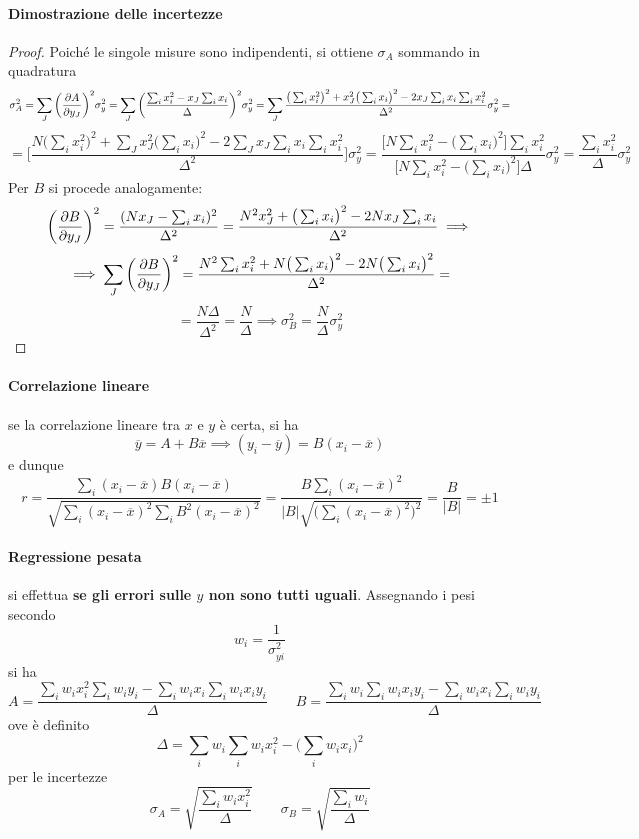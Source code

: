 \documentclass[10pt, oneside]{book}
\begin{document}
\paragraph{Dimostrazione delle incertezze}
\begin{proof}
Poiché le singole misure sono indipendenti, si ottiene $\sigma_A$ sommando in quadratura
\[\sigma_A^2 = \sum_J \bigg(\pdv{A}{y_J}\bigg)^2 \sigma_y^2 = \sum_J \bigg(\frac{\sum_i x_i^2 - x_J \sum_i x_i}{\Delta}\bigg)^{2} \sigma_y^2 = \sum_J \frac{\big(\sum_i x_i^2\big)^2 + x_J^2 \big(\sum_i x_i\big)^2 - 2 x_J \sum_i x_i \sum_i x_i^2}{\Delta^2} \sigma_y^2 = \]
\[= \bigg[\frac{N \big(\sum_i x_i^2\big)^2 + \sum_J x_J^2 \big(\sum_i x_i\big)^2 - 2 \sum_J x_J \sum_i x_i \sum_i x_i^2}{\Delta^2}\bigg] \sigma_y^2 = \frac{\big[N \sum_i x_i^2 - \big(\sum_i x_i\big)^2\big] \sum_i x_i^2}{\big[N \sum_i x_i^2 - \big(\sum_i x_i\big)^2\big] \Delta} \sigma_y^2 = \frac{\sum_i x_i^2}{\Delta} \sigma_y^2\]
Per $B$ si procede analogamente:
\[\bigg(\pdv{B}{y_J}\bigg)^2 = \frac{(N x_J - \sum_i x_i)^2}{\Delta^2} = \frac{N^2 x_J^2 + \big(\sum_i x_i\big)^2 - 2 N x_J \sum_i x_i}{\Delta^2} \implies \]
\[\implies \sum_J \bigg(\pdv{B}{y_J}\bigg)^2 = \frac{N^2 \sum_i x_i^2 + N \big(\sum_i x_i\big)^2 - 2 N \big(\sum_i x_i\big)^2}{\Delta^2} =\]
\[= \frac{N \Delta}{\Delta^2} = \frac{N}{\Delta} \implies \sigma_B^2 = \frac{N}{\Delta} \sigma_y^2\]
\end{proof}

\paragraph{Correlazione lineare} se la correlazione lineare tra $x$ e $y$ è certa, si ha
\[\overline{y} = A + B \overline{x} \implies (y_i - \overline{y}) = B (x_i - \overline{x})\]
e dunque
\[r = \frac{\sum_i (x_i - \overline{x}) B (x_i - \overline{x})}{\sqrt{\sum_i (x_i - \overline{x})^2 \sum_i B^2 (x_i - \overline{x})^2}} = \frac{B \sum_i (x_i - \overline{x})^2}{|B| \sqrt{\big(\sum_i (x_i - \overline{x})^2\big)^2}} = \frac{B}{|B|} = \pm 1\]
\paragraph{Regressione pesata} si effettua \textbf{se gli errori sulle $y$ non sono tutti uguali}. Assegnando i pesi secondo
\[w_i = \frac{1}{\sigma_{yi}^2}\]
si ha
\[A = \frac{\sum_i w_i x_i^2 \sum_i w_i y_i - \sum_i w_i x_i \sum_i w_i x_i y_i}{\Delta} \qquad B = \frac{\sum_i w_i \sum_i w_i x_i y_i - \sum_i w_i x_i \sum_i w_i y_i}{\Delta}\]
ove è definito
\[\Delta = \sum_i w_i \sum_i w_i x_i^2 - \bigg(\sum_i w_i x_i\bigg)^2\]
per le incertezze
\[\sigma_A = \sqrt{\frac{\sum_i w_i x_i^2}{\Delta}}\qquad \sigma_B = \sqrt{\frac{\sum_i w_i}{\Delta}}\]
\end{document}
